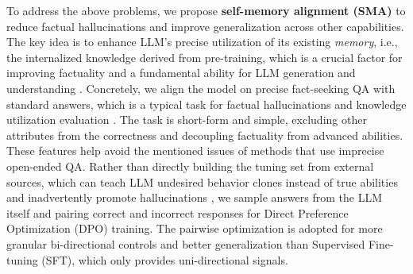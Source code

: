 To address the above problems, we propose \textbf{self-memory alignment (SMA)} to reduce factual hallucinations and improve generalization across other capabilities. The key idea is to enhance LLM's precise utilization of its existing \textit{memory}, i.e., the internalized knowledge derived from pre-training, which is a crucial factor for improving factuality \citep{wang2023survey} and a fundamental ability for LLM generation and understanding \cite{zhao2023survey}. Concretely, we align the model on precise fact-seeking QA with standard answers, which is a typical task for factual hallucinations and knowledge utilization evaluation \citep{roberts2020much, ji2023survey, zhao2023survey}. The task is short-form and simple, excluding other attributes from the correctness and decoupling factuality from advanced abilities. These features help avoid the mentioned issues of methods that use imprecise open-ended QA. Rather than directly building the tuning set from external sources, which can teach LLM undesired behavior clones instead of true abilities \citep{gudibande2023false, zhang2023siren} and inadvertently promote hallucinations \citep{huang2023survey, flame, gekhman2024does}, we sample answers from the LLM itself and pairing correct and incorrect responses for Direct Preference Optimization (DPO) \citep{rafailov2023direct} training. The pairwise optimization is adopted for more granular bi-directional controls and better generalization \citep{zhang2023siren, chu2025sft} than Supervised Fine-tuning (SFT), which only provides uni-directional signals.


